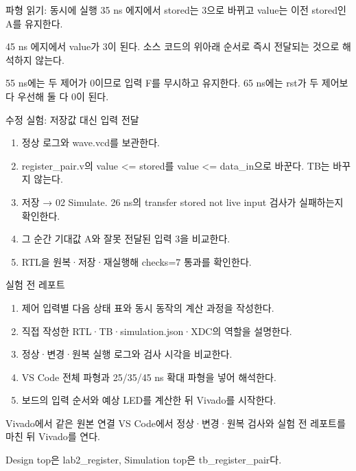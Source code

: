 \begin{frame}{파형 읽기: 동시에 실행}
\small
35 ns 에지에서 stored는 3으로 바뀌고 value는 이전 stored인 A를 유지한다.\par\vspace{0.26cm}45 ns 에지에서 value가 3이 된다. 소스 코드의 위아래 순서로 즉시 전달되는 것으로 해석하지 않는다.\par\vspace{0.26cm}55 ns에는 두 제어가 0이므로 입력 F를 무시하고 유지한다. 65 ns에는 rst가 두 제어보다 우선해 둘 다 0이 된다.\par
\end{frame}

\begin{frame}{수정 실험: 저장값 대신 입력 전달}
\small
\begin{enumerate}
\item 정상 로그와 wave.vcd를 보관한다.
\item register\_pair.v의 value <= stored를 value <= data\_in으로 바꾼다. TB는 바꾸지 않는다.
\item 저장 → 02 Simulate. 26 ns의 transfer stored not live input 검사가 실패하는지 확인한다.
\item 그 순간 기대값 A와 잘못 전달된 입력 3을 비교한다.
\item RTL을 원복·저장·재실행해 checks=7 통과를 확인한다.
\end{enumerate}
\end{frame}

\begin{frame}[label=reports]{실험 전 레포트}
\small
\begin{enumerate}
\item 제어 입력별 다음 상태 표와 동시 동작의 계산 과정을 작성한다.
\item 직접 작성한 RTL·TB·simulation.json·XDC의 역할을 설명한다.
\item 정상·변경·원복 실행 로그와 검사 시각을 비교한다.
\item VS Code 전체 파형과 25/35/45 ns 확대 파형을 넣어 해석한다.
\item 보드의 입력 순서와 예상 LED를 계산한 뒤 Vivado를 시작한다.
\end{enumerate}
\end{frame}

\begin{frame}[label=implementation]{Vivado에서 같은 원본 연결}
\small
VS Code에서 정상·변경·원복 검사와 실험 전 레포트를 마친 뒤 Vivado를 연다.\par\vspace{0.26cm}Design top은 lab2\_register, Simulation top은 tb\_register\_pair다.\par
\end{frame}

